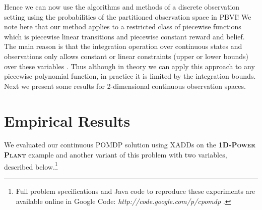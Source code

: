 \documentclass{article} %
\begin{document}
Hence we can now use the algorithms and methods of a discrete observation setting using the probabilities of the partitioned observation space in PBVI! 
We note here that our method applies to a restricted class of piecewise functions which is piecewise linear transitions and piecewise constant reward and belief. The main reason is that the integration operation over continuous states and observations only allows constant or linear constraints (upper or lower bounds) over these variables \cite{sanner_aaai12}. Thus although in theory we can apply this approach to any piecewise polynomial function, in practice it is limited by the integration bounds.  %
Next we present some results for 2-dimensional continuous observation spaces.


\section{Empirical Results}
We evaluated our continuous POMDP solution using XADDs on the
\textsc{\bf 1D-Power Plant} example and another variant of this
problem with two variables, described below.\footnote{ Full problem
specifications and Java code to reproduce these experiments are available online in
Google Code: \textit{http://code.google.com/p/cpomdp} .}
\end{document}
